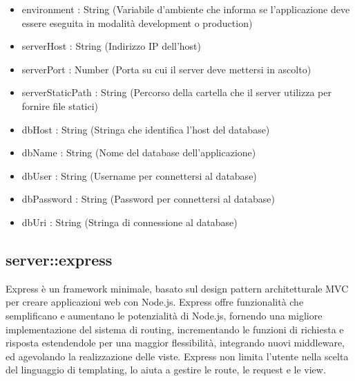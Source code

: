 \begin{description}
\begin{itemize}
\item environment : String (Variabile d'ambiente che informa se l'applicazione deve essere eseguita in modalità development o production)
\item serverHost : String (Indirizzo IP dell'host)
\item serverPort : Number (Porta su cui il server deve mettersi in ascolto)
\item serverStaticPath : String (Percorso della cartella che il server utilizza per fornire file statici)
\item dbHost : String (Stringa che identifica l'host del database)
\item dbName : String (Nome del database dell'applicazione)
\item dbUser : String (Username per connettersi al database)
\item dbPassword : String (Password per connettersi al database)
\item dbUri : String (Stringa di connessione al database)
\end{itemize}

\end{description}

\vspace{0.5cm}
\subsection{server::express}
Express è un framework minimale, basato sul design pattern architetturale MVC per creare applicazioni web con Node.js. Express offre funzionalità che semplificano e aumentano le potenzialità di Node.js, fornendo una migliore implementazione del sistema di routing, incrementando
le funzioni di richiesta e risposta estendendole per una maggior flessibilità, integrando nuovi middleware, ed agevolando la realizzazione delle viste.
Express non limita l’utente nella scelta del linguaggio di templating, lo aiuta a gestire le route, le request e le view.
